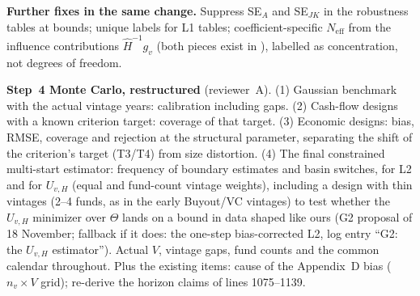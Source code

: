 \documentclass[11pt]{article}
\newcommand{\code}[1]{\texttt{\detokenize{#1}}}
\begin{document}
\textbf{Further fixes in the same change.} Suppress SE$_A$ and SE$_{JK}$ in the robustness tables at bounds; unique labels for L1 tables; coefficient-specific $N_{\mathrm{eff}}$ from the influence contributions $\widehat H^{-1}g_v$ (both pieces exist in \code{sandwich.covariance}), labelled as concentration, not degrees of freedom.

\textbf{Step~4 Monte Carlo, restructured} (reviewer~A). (1) Gaussian benchmark with the actual vintage years: calibration including gaps. (2) Cash-flow designs with a known criterion target: coverage of that target. (3) Economic designs: bias, RMSE, coverage and rejection at the structural parameter, separating the shift of the criterion's target (T3/T4) from size distortion. (4) The final constrained multi-start estimator: frequency of boundary estimates and basin switches, for L2 and for $U_{v,H}$ (equal and fund-count vintage weights), including a design with thin vintages (2--4 funds, as in the early Buyout/VC vintages) to test whether the $U_{v,H}$ minimizer over $\Theta$ lands on a bound in data shaped like ours (G2 proposal of 18 November; fallback if it does: the one-step bias-corrected L2, log entry ``G2: the $U_{v,H}$ estimator''). Actual $V$, vintage gaps, fund counts and the common calendar throughout. Plus the existing items: cause of the Appendix~D bias ($n_v\times V$ grid); re-derive the horizon claims of lines 1075--1139.
\end{document}
